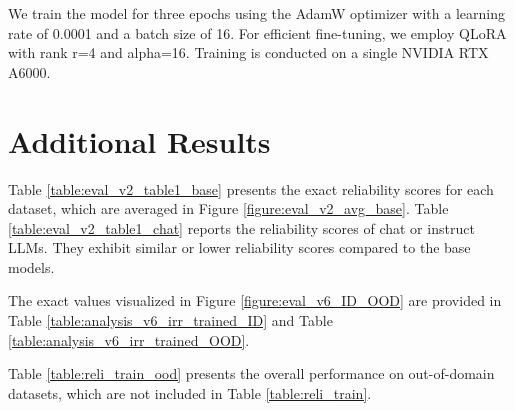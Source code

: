 We train the model for three epochs using the AdamW \cite{loshchilov2017decoupled} optimizer with a learning rate of 0.0001 and a batch size of 16. For efficient fine-tuning, we employ QLoRA \cite{dettmers2023qlora} with rank r=4 and alpha=16.
Training is conducted on a single NVIDIA RTX A6000.



\section{Additional Results}





Table \ref{table:eval_v2_table1_base} presents the exact reliability scores for each dataset, which are averaged in Figure \ref{figure:eval_v2_avg_base}.
Table \ref{table:eval_v2_table1_chat} reports the reliability scores of chat or instruct LLMs. They exhibit similar or lower reliability scores compared to the base models.






The exact values visualized in Figure \ref{figure:eval_v6_ID_OOD} are provided in Table \ref{table:analysis_v6_irr_trained_ID} and Table \ref{table:analysis_v6_irr_trained_OOD}.


Table \ref{table:reli_train_ood} presents the overall performance on out-of-domain datasets, which are not included in Table \ref{table:reli_train}.